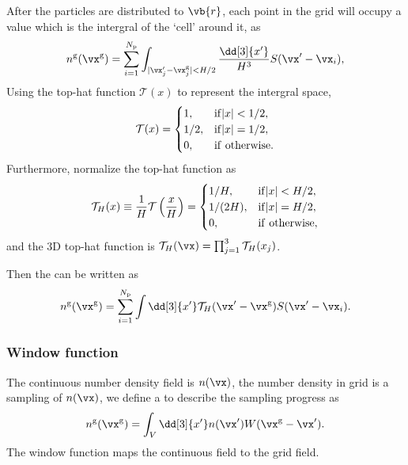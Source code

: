 \documentclass{article}
\begin{document}
After the particles are distributed to $\vb{r}$, each point in the grid will occupy a value which is the intergral of the `cell' around it, as 
\begin{equation} \label{eq:density_on_grid_define}
    n^{\rm g}(\vx^{\rm g}) = \sum_{i=1}^{N_{\rm p}}  \int_{|\vx^{\prime}_{j} - \vx^{\rm g}_{j}| < H/2 } \frac{\dd[3]{x^{\prime}}}{H^3} S(\vx^{\prime} - \vx_{i}), 
\end{equation}
Using the top-hat function $\mathcal{T} (x)$ to represent the intergral space, 
\begin{eqnarray}
    \mathcal{T} (x) = 
    \begin{cases}
        1, & {\rm if} |x| < 1/2, \\
        1/2, & {\rm if} |x| = 1/2, \\
        0, & {\rm if~otherwise}. 
    \end{cases}
\end{eqnarray}
Furthermore, 
normalize the top-hat function as 
\begin{eqnarray}\label{eq:top-hat_H}
    \mathcal{T}_{H} (x) \equiv \frac{1}{H} \mathcal{T}\left(\frac{x}{H}\right) = 
    \begin{cases}
        1/H, & {\rm if} |x| < H/2, \\
        1/(2H), & {\rm if} |x| = H/2, \\
        0, & {\rm if~otherwise}, 
    \end{cases}
\end{eqnarray}
and the 3D top-hat function is  $\mathcal{T}_{H}(\vx) = \prod_{j=1}^{3} \mathcal{T}_{H}(x_{j})$.

Then the  can be written as
\begin{equation}\label{eq:distribute_grid}
    n^{\rm g}(\vx^{\rm g}) = \sum_{i=1}^{N_{\rm p}} \int \dd[3]{x^{\prime}} \mathcal{T}_{H}(\vx^{\prime} - \vx^{\rm g}) S(\vx^{\prime} - \vx_{i}).
\end{equation}

\subsubsection*{Window function}
The continuous number density field is $n(\vx)$, 
the number density in grid is a sampling of $n(\vx)$, we define a  to describe the sampling progress as
\begin{equation}\label{eq:sampling}
    n^{\rm g}(\vx^{\rm g}) = \int_{V} \dd[3]{x^{\prime}} n(\vx^{\prime}) W(\vx^{\rm g}- \vx^{\prime}).
\end{equation}
The window function maps the continuous field to the grid field. 
\end{document}
